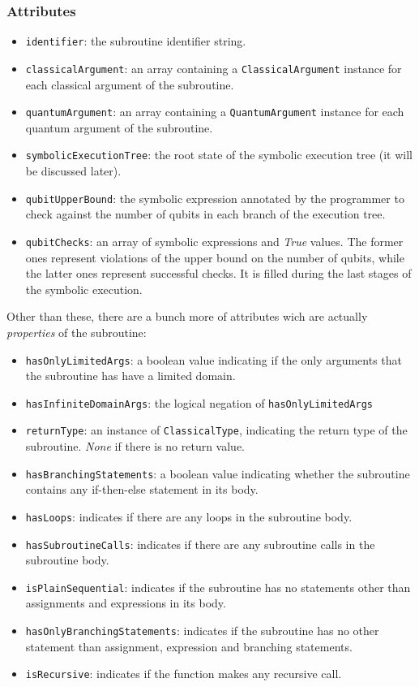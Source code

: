 \documentclass[12pt,a4paper]{report}
\theoremstyle{definition}
\theoremstyle{definition}
\theoremstyle{definition}
\begin{document}
\subsubsection{Attributes}
\begin{itemize}
    \itemsep 0em
    \item \texttt{identifier}: the subroutine identifier string.
    \item \texttt{classicalArgument}: an array containing a \texttt{ClassicalArgument} instance for each classical argument of the subroutine.
    \item \texttt{quantumArgument}: an array containing a \texttt{QuantumArgument} instance for each quantum argument of the subroutine.
    \item \texttt{symbolicExecutionTree}: the root state of the symbolic execution tree (it will be discussed later).
    \item \texttt{qubitUpperBound}: the symbolic expression annotated by the programmer to check against the number of qubits in each branch of the execution tree.
    \item \texttt{qubitChecks}: an array of symbolic expressions and \textit{True} values. The former ones represent violations of the upper bound on the number of qubits, while the latter ones represent successful checks. It is filled during the last stages of the symbolic execution.
\end{itemize}
Other than these, there are a bunch more of attributes wich are actually \textit{properties} of the subroutine:
\begin{itemize}
    \itemsep 0em
    \item \texttt{hasOnlyLimitedArgs}: a boolean value indicating if the only arguments that the subroutine has have a limited domain.
    \item \texttt{hasInfiniteDomainArgs}: the logical negation of \texttt{hasOnlyLimitedArgs}
    \item \texttt{returnType}: an instance of \texttt{ClassicalType}, indicating the return type of the subroutine. \textit{None} if there is no return value.
    \item \texttt{hasBranchingStatements}: a boolean value indicating whether the subroutine contains any if-then-else statement in its body.
    \item \texttt{hasLoops}: indicates if there are any loops in the subroutine body.
    \item \texttt{hasSubroutineCalls}: indicates if there are any subroutine calls in the subroutine body.
    \item \texttt{isPlainSequential}: indicates if the subroutine has no statements other than assignments and expressions in its body.
    \item \texttt{hasOnlyBranchingStatements}: indicates if the subroutine has no other statement than assignment, expression and branching statements.
    \item \texttt{isRecursive}: indicates if the function makes any recursive call.
\end{itemize}
\end{document}
